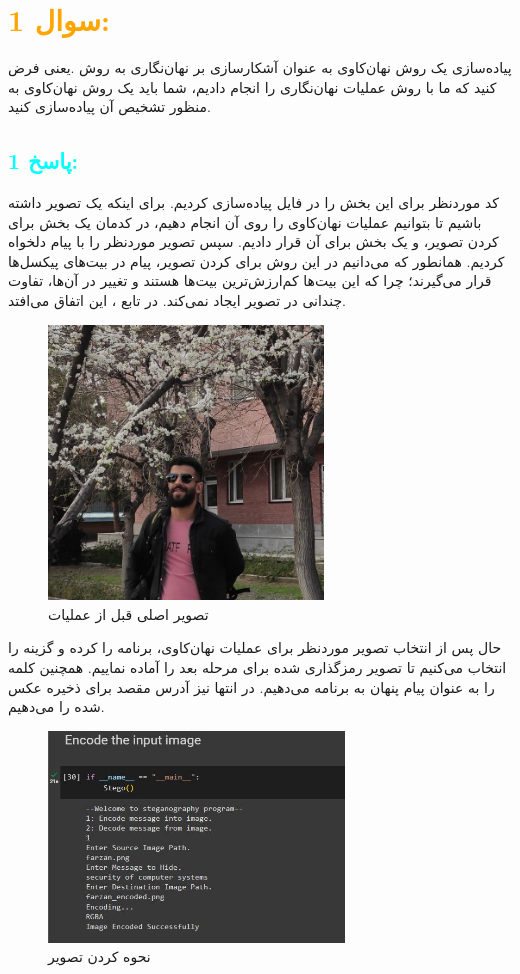 \section*{\textcolor{orange}{سوال 1:}}
پیاده‌‌سازی یک روش نهان‌کاوی به عنوان آشکارسازی بر نهان‌نگاری به روش  .یعنی فرض کنید که ما با روش  عملیات نهان‌نگاری را انجام دادیم، شما باید یک روش نهان‌کاوی به منظور تشخیص آن پیاده‌سازی کنید.
\subsection*{\textcolor{cyan}{پاسخ 1:}}
کد موردنظر برای این بخش را در فایل  پیاده‌سازی کردیم. برای اینکه یک تصویر داشته باشیم تا بتوانیم عملیات نهان‌کاوی را روی آن انجام دهیم، در کدمان یک بخش برای  کردن تصویر، و یک بخش برای  آن قرار دادیم. سپس تصویر موردنظر را با پیام دلخواه  کردیم. همانطور که می‌دانیم در این روش برای  کردن تصویر، پیام در بیت‌های  پیکسل‌ها قرار می‌گیرند؛ چرا که این بیت‌ها کم‌ارزش‌ترین بیت‌ها هستند و تغییر در آن‌ها، تفاوت چندانی در تصویر ایجاد نمی‌کند. در تابع ، این اتفاق می‌افتد.
\begin{figure}[H]
  \centering
  \includegraphics[width=0.65\textwidth]{Images/farzan.png}
  \caption{تصویر اصلی قبل از عملیات }   
\end{figure}
حال پس از انتخاب تصویر موردنظر برای عملیات نهان‌کاوی، برنامه را  کرده و گزینه  را انتخاب می‌کنیم تا تصویر رمزگذاری شده برای مرحله بعد را آماده نماییم. همچنین کلمه  را به عنوان پیام پنهان به برنامه می‌دهیم. در انتها نیز آدرس مقصد برای ذخیره عکس  شده را می‌دهیم.
\begin{figure}[H]
  \centering
  \includegraphics[width=0.7\textwidth]{Images/q1_1.JPG}
  \caption{نحوه  کردن تصویر}   
\end{figure}
